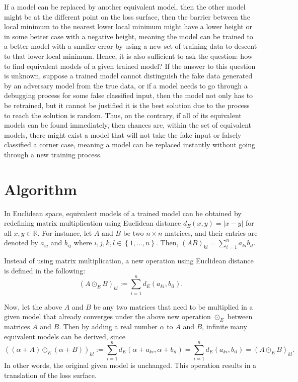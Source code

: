 \documentclass{article}
\theoremstyle{plain}
\theoremstyle{plain} %
\theoremstyle{definition}  %
\theoremstyle{remark}  %
\theoremstyle{plain}
\begin{document}
If a model can be replaced by another equivalent model, then the other model might be at the different point on the loss surface, then the barrier between the local minimum to the nearest lower local minimum might have a lower height or in some better case with a negative height, meaning the model can be trained to a better model with a smaller error by using a new set of training data to descent to that lower local minimum. Hence, it is also sufficient to ask the question: how to find equivalent models of a given trained model? If the answer to this question is unknown, suppose a trained model cannot distinguish the fake data generated by an adversary model from the true data, or if a model needs to go through a debugging process for some false classified input, then the model not only has to be retrained, but it cannot be justified it is the best solution due to the process to reach the solution is random. Thus, on the contrary, if all of its equivalent models can be found immediately, then chances are, within the set of equivalent models, there might exist a model that will not take the fake input or falsely classified a corner case, meaning a model can be replaced instantly without going through a new training process.


\section{Algorithm}
In Euclidean space, equivalent models of a trained model can be obtained by redefining matrix multiplication using Euclidean distance $d_E(x,y)=\vert x-y\vert$ for all $x, y\in\mathbb{R}$. For instance, let $A$ and $B$ be two $n\times n$ matrices, and their entries are denoted by $a_{ij}$ and $b_{ij}$ where $i,j,k,l\in\left\lbrace 1,...,n\right\rbrace$. Then, $\left( A B\right)_{kl}=\sum\limits_{i=1}^n a_{ki}b_{il}$.

Instead of using matrix multiplication, a new operation using Euclidean distance is defined in the following:
$$
\left( A\odot_{E} B \right)_{kl}:= \sum\limits_{i=1}^n d_{E} \left( a_{ki} , b_{il} \right).
$$

Now, let the above $A$ and $B$ be any two matrices that need to be multiplied in a given model that already converges under the above new operation $\odot_{E}$ between matrices $A$ and $B$. Then by adding a real number $\alpha$ to $A$ and $B$, infinite many equivalent models can be derived, since
$$
\left( \left( \alpha + A \right) \odot_{E}\left( \alpha+ B \right)\right)_{kl} := \sum\limits_{i=1}^n d_{E} \left(\alpha + a_{ki} ,\alpha + b_{il} \right) = \sum\limits_{i=1}^n d_{E} \left( a_{ki} ,  b_{il} \right) = \left( A\odot_{E} B\right)_{kl}.
$$
In other words, the original given model is unchanged. This operation results in a translation of the loss surface. 
\end{document}
